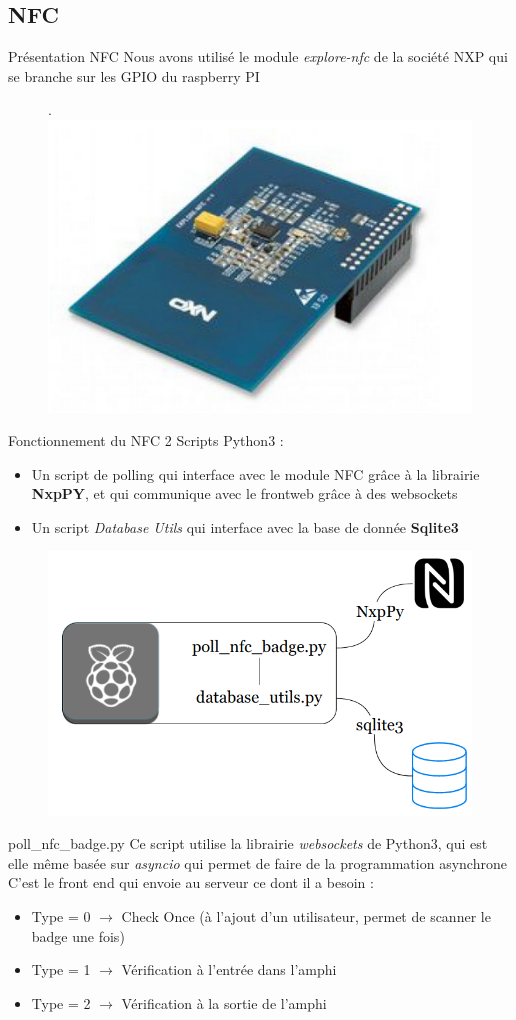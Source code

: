 \documentclass[aspectratio=169]{beamer}
\begin{document}
\subsection{NFC}

\begin{frame}{Présentation NFC}
  Nous avons utilisé le module \textit{explore-nfc} de la société NXP qui se branche sur les GPIO du raspberry PI
  \begin{figure}.
    \includegraphics[width=.5\textwidth]{../assets/explorenfc.png}
  \end{figure}
\end{frame}

\begin{frame}{Fonctionnement du NFC}
  2 Scripts Python3 :
  \begin{itemize}
    \item Un script de polling qui interface avec le module NFC grâce à la librairie \textbf{NxpPY}, et qui communique avec le frontweb grâce à des websockets
    \item Un script \textit{Database Utils} qui interface avec la base de donnée \textbf{Sqlite3}
  \end{itemize}
  \begin{figure}
    \centering
    \includegraphics[width=.5\textwidth]{../assets/nfcarchitecture.png}
  \end{figure}
\end{frame}

\begin{frame}{poll\_nfc\_badge.py}
  Ce script utilise la librairie \textit{websockets} de Python3, qui est elle même basée sur \textit{asyncio} qui permet de faire de la programmation asynchrone
  C'est le front end qui envoie au serveur ce dont il a besoin :
  \begin{itemize}
    \item Type = 0 $\rightarrow$ Check Once (à l'ajout d'un utilisateur, permet de scanner le badge une fois)
    \item Type = 1 $\rightarrow$ Vérification à l'entrée dans l'amphi
    \item Type = 2 $\rightarrow$ Vérification à la sortie de l'amphi
  \end{itemize}

\end{frame}
\end{document}
